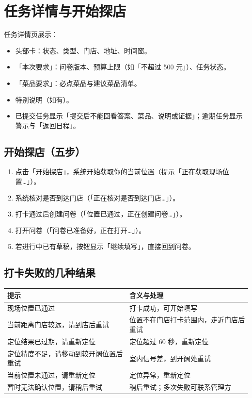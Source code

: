 \documentclass[12pt,a4paper,fontset=none]{ctexart}
\begin{document}
\section{任务详情与开始探店}

任务详情页展示：

\begin{itemize}
\item 头部卡：状态、类型、门店、地址、时间窗。
\item 「本次要求」：问卷版本、预算上限（如「不超过 500 元」）、任务状态。
\item 「菜品要求」：必点菜品与建议菜品清单。
\item 特别说明（如有）。
\item 已提交任务显示「提交后不能回看答案、菜品、说明或证据」；逾期任务显示警示与「返回日程」。
\end{itemize}

\subsection{开始探店（五步）}
\begin{enumerate}
\item 点击「开始探店」，系统开始获取你的当前位置（提示「正在获取现场位置…」）。
\item 系统核对是否到达门店（「正在核对是否到达门店…」）。
\item 打卡通过后创建问卷（「位置已通过，正在创建问卷…」）。
\item 打开问卷（「问卷已准备好，正在打开…」）。
\item 若进行中已有草稿，按钮显示「继续填写」，直接回到问卷。
\end{enumerate}


\subsection{打卡失败的几种结果}

\begin{center}
\begin{tabular}{p{5.2cm}p{8cm}}
\toprule
提示 & 含义与处理 \\
\midrule
现场位置已通过 & 打卡成功，可开始填写 \\
当前距离门店较远，请到店后重试 & 位置不在门店打卡范围内，走近门店后重试 \\
定位结果已过期，请重新定位 & 定位超过 60 秒，重新定位 \\
定位精度不足，请移动到较开阔位置后重试 & 室内信号差，到开阔处重试 \\
当前位置未通过，请重新定位 & 定位异常，重新定位 \\
暂时无法确认位置，请稍后重试 & 稍后重试；多次失败可联系管理方 \\
\bottomrule
\end{tabular}
\end{center}
\end{document}
